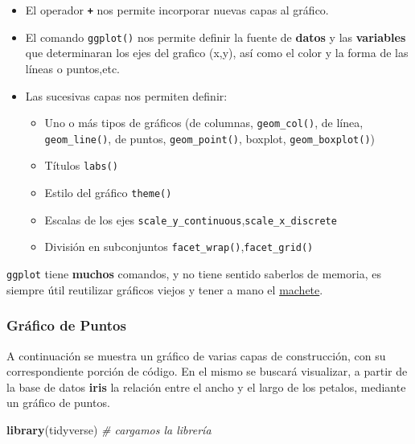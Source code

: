 \documentclass[]{book}
\newenvironment{Shaded}{\begin{snugshade}}{\end{snugshade}}
\newcommand{\CommentTok}[1]{\textcolor[rgb]{0.56,0.35,0.01}{\textit{#1}}}
\newcommand{\KeywordTok}[1]{\textcolor[rgb]{0.13,0.29,0.53}{\textbf{#1}}}
\newcommand{\NormalTok}[1]{#1}
\providecommand{\tightlist}{%
  \setlength{\itemsep}{0pt}\setlength{\parskip}{0pt}}
\begin{document}
\begin{itemize}
\item
  El operador \textbf{\texttt{+}} nos permite incorporar nuevas capas al gráfico.
\item
  El comando \texttt{ggplot()} nos permite definir la fuente de \textbf{datos} y las \textbf{variables} que determinaran los ejes del grafico (x,y), así como el color y la forma de las líneas o puntos,etc.
\item
  Las sucesivas capas nos permiten definir:

  \begin{itemize}
  \tightlist
  \item
    Uno o más tipos de gráficos (de columnas, \texttt{geom\_col()}, de línea, \texttt{geom\_line()}, de puntos, \texttt{geom\_point()}, boxplot, \texttt{geom\_boxplot()})
  \item
    Títulos \texttt{labs()}
  \item
    Estilo del gráfico \texttt{theme()}
  \item
    Escalas de los ejes \texttt{scale\_y\_continuous},\texttt{scale\_x\_discrete}
  \item
    División en subconjuntos \texttt{facet\_wrap()},\texttt{facet\_grid()}
  \end{itemize}
\end{itemize}

\texttt{ggplot} tiene \textbf{muchos} comandos, y no tiene sentido saberlos de memoria, es siempre útil reutilizar gráficos viejos y tener a mano el \href{https://www.rstudio.com/wp-content/uploads/2016/11/ggplot2-cheatsheet-2.1.pdf}{machete}.

\hypertarget{grafico-de-puntos}{%
\subsubsection{Gráfico de Puntos}\label{grafico-de-puntos}}

A continuación se muestra un gráfico de varias capas de construcción, con su correspondiente porción de código. En el mismo se buscará visualizar, a partir de la base de datos \textbf{iris} la relación entre el ancho y el largo de los petalos, mediante un gráfico de puntos.

\begin{Shaded}
\begin{Highlighting}[]
\KeywordTok{library}\NormalTok{(tidyverse) }\CommentTok{# cargamos la librería}
\end{Highlighting}
\end{Shaded}
\end{document}
